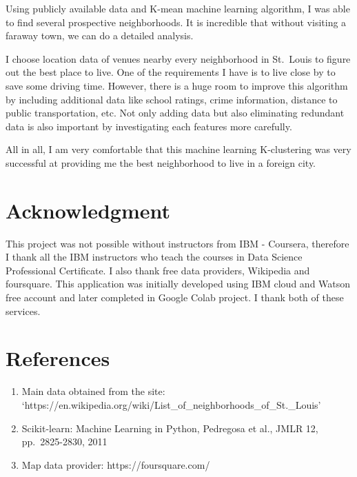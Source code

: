 \documentclass[11pt]{article}
\begin{document}
    Using publicly available data and K-mean machine learning algorithm, I
was able to find several prospective neighborhoods. It is incredible
that without visiting a faraway town, we can do a detailed analysis.

I choose location data of venues nearby every neighborhood in St.~Louis
to figure out the best place to live. One of the requirements I have is
to live close by to save some driving time. However, there is a huge
room to improve this algorithm by including additional data like school
ratings, crime information, distance to public transportation, etc. Not
only adding data but also eliminating redundant data is also important
by investigating each features more carefully.

All in all, I am very comfortable that this machine learning
K-clustering was very successful at providing me the best neighborhood
to live in a foreign city.

    \hypertarget{acknowladgement}{%
\section{Acknowledgment}\label{acknowladgement}}

This project was not possible without instructors from IBM - Coursera,
therefore I thank all the IBM instructors who teach the courses in Data
Science Professional Certificate. I also thank free data providers,
Wikipedia and foursquare. This application was initially developed using
IBM cloud and Watson free account and later completed in Google Colab
project. I thank both of these services.

    \hypertarget{references}{%
\section{References}\label{references}}

\begin{enumerate}
\def\labelenumi{\arabic{enumi}.}
\item
  Main data obtained from the site: \\
  `https://en.wikipedia.org/wiki/List\_of\_neighborhoods\_of\_St.\_Louis'
\item
  Scikit-learn: Machine Learning in Python, Pedregosa et al., JMLR 12,
  pp.~2825-2830, 2011
\item
  Map data provider: https://foursquare.com/
\end{enumerate}


    
    
    
    
\end{document}

